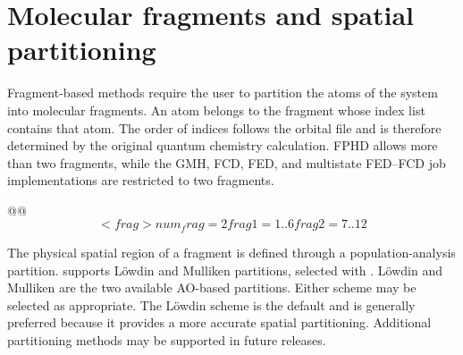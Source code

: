 \section{Molecular fragments and spatial partitioning}\label{sec-diabat-frag}
Fragment-based methods require the user to partition the atoms of the system into molecular fragments. An atom belongs to the fragment whose index list contains that atom. The order of indices follows the orbital file and is therefore determined by the original quantum chemistry calculation. FPHD allows more than two fragments, while the GMH, FCD, FED, and multistate FED--FCD job implementations are restricted to two fragments.

\begin{lst-script}[escapechar=@]
@@
$$<frag>
  num_frag = 2
  frag 1 = 1..6
  frag 2 = 7..12
$$
\end{lst-script}
The physical spatial region of a fragment is defined through a population-analysis partition. \progname{} supports L\"owdin\cite{Loewdin-JCP-1950-p365} and Mulliken\cite{Mulliken-JCP-1955-p1833} partitions, selected with . L\"owdin and Mulliken are the two available AO-based partitions. 
Either scheme may be selected as appropriate.
The L\"owdin scheme is the default and is generally preferred because it provides a more accurate spatial partitioning.
Additional partitioning methods may be supported in future releases.
